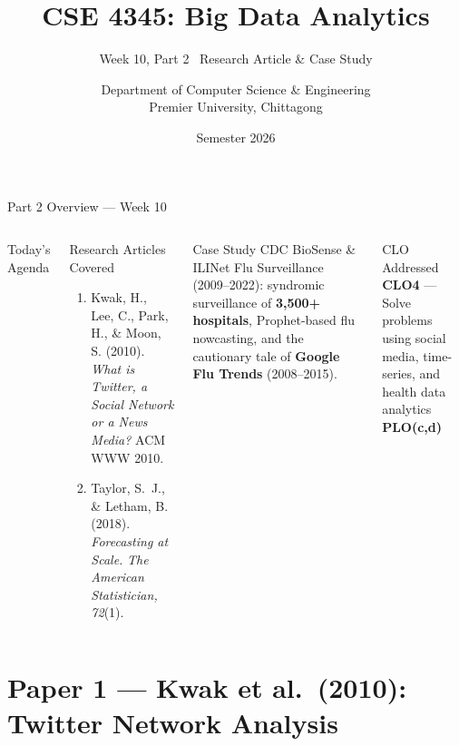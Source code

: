 \documentclass[aspectratio=169,10pt]{beamer}
\title[CSE 4345 \textbar{} Week 10, Part 2]{CSE 4345: Big Data Analytics}
\subtitle{Week 10, Part 2 \textemdash\ Research Article \& Case Study}
\author[Dept.\ of CSE]{Department of Computer Science \& Engineering\\[4pt]
       \small Premier University, Chittagong}
\institute{}
\date{Semester 2026}
\begin{document}

\begin{frame}
  \titlepage
\end{frame}

\begin{frame}{Part 2 Overview — Week 10}
  \begin{columns}[T]
      \begin{block}{Today's Agenda}
        \tableofcontents
      \end{block}
      \begin{exampleblock}{Research Articles Covered}
        \begin{enumerate}
          \item Kwak, H., Lee, C., Park, H., \& Moon, S. (2010).
                \textit{What is Twitter, a Social Network or a
                News Media?} ACM WWW 2010.
          \item Taylor, S.~J., \& Letham, B. (2018).
                \textit{Forecasting at Scale.}
                \textit{The American Statistician, 72}(1).
        \end{enumerate}
      \end{exampleblock}
      \vspace{6pt}
      \begin{alertblock}{Case Study}
        CDC BioSense \& ILINet Flu Surveillance (2009--2022):
        syndromic surveillance of \textbf{3{,}500+ hospitals},
        Prophet-based flu nowcasting, and the cautionary tale
        of \textbf{Google Flu Trends} (2008--2015).
      \end{alertblock}
      \vspace{4pt}
      \begin{block}{CLO Addressed}
        \textbf{CLO4} — Solve problems using social media,
        time-series, and health data analytics\\
        \textbf{PLO(c,d)}
      \end{block}
  \end{columns}
\end{frame}

\section{Paper 1 — Kwak et al.\ (2010): Twitter Network Analysis}
\end{document}
